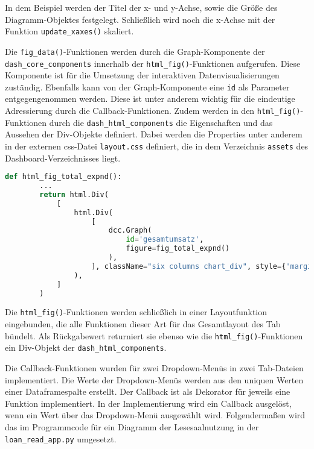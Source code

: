     In dem Beispiel werden der Titel der x- und y-Achse, sowie die
    Größe des Diagramm-Objektes festgelegt. Schließlich wird noch die x-Achse mit der Funktion \texttt{update\_xaxes()} skaliert.
    
    Die \texttt{fig\_data()}-Funktionen werden durch die Graph-Komponente der \texttt{dash\_core\_components} innerhalb der 
    \texttt{html\_fig()}-Funktionen aufgerufen. Diese Komponente ist für die Umsetzung der interaktiven Datenvisualisierungen 
    zuständig. Ebenfalls kann von der Graph-Komponente eine \texttt{id} als Parameter entgegengenommen werden. 
    Diese ist unter anderem wichtig für die eindeutige Adressierung durch die Callback-Funktionen.
    Zudem werden in den \texttt{html\_fig()}-Funktionen durch die \texttt{dash\_html\_components} die Eigenschaften und 
    das Aussehen der Div-Objekte definiert. 
    Dabei werden die Properties unter anderem in der externen css-Datei \texttt{layout.css} definiert, die in dem Verzeichnis \texttt{assets} 
    des Dashboard-Verzeichnisses liegt.

    \begin{lstlisting}[language=Python, caption={html\_fig\_total\_expnd()}] 
        def html_fig_total_expnd():
        ...
        return html.Div(
            [
                html.Div(
                    [
                        dcc.Graph(
                            id='gesamtumsatz',
                            figure=fig_total_expnd()
                        ),
                    ], className="six columns chart_div", style={'margin-top': '20px', 'margin-left': '10px'}
                ),
            ]
        )
        \end{lstlisting}
    
    Die \texttt{html\_fig()}-Funktionen werden schließlich in einer Layoutfunktion eingebunden, die alle Funktionen dieser Art
    für das Gesamtlayout des Tab bündelt. Als Rückgabewert returniert sie ebenso wie die \texttt{html\_fig()}-Funktionen ein Div-Objekt der \texttt{dash\_html\_components}.


    Die Callback-Funktionen wurden für zwei Dropdown-Menüs in zwei Tab-Dateien implementiert.
    Die Werte der Dropdown-Menüs werden aus den uniquen Werten einer Dataframespalte erstellt.
    Der Callback ist als Dekorator für jeweils eine Funktion implementiert. 
    In der Implementierung wird ein Callback ausgelöst, wenn ein Wert über das Dropdown-Menü ausgewählt wird.
    Folgendermaßen wird das im Programmcode für ein Diagramm der Lesesaalnutzung in der \texttt{loan\_read\_app.py} umgesetzt.

